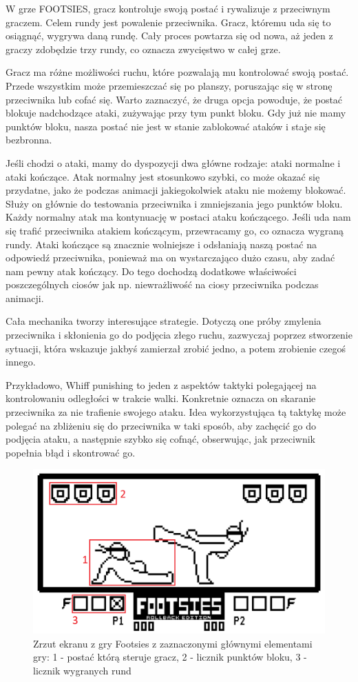 W grze FOOTSIES, gracz kontroluje swoją postać i rywalizuje z przeciwnym graczem. Celem rundy jest powalenie przeciwnika. Gracz, któremu uda się to osiągnąć, wygrywa daną rundę. Cały proces powtarza się od nowa, aż jeden z graczy zdobędzie trzy rundy, co oznacza zwycięstwo w całej grze.

Gracz ma różne możliwości ruchu, które pozwalają mu kontrolować swoją postać. Przede wszystkim może przemieszczać się po planszy, poruszając się w stronę przeciwnika lub cofać się. Warto zaznaczyć, że druga opcja powoduje, że postać blokuje nadchodzące ataki, zużywając przy tym punkt bloku. Gdy już nie mamy punktów bloku, nasza postać nie jest w stanie zablokować ataków i staje się bezbronna.

Jeśli chodzi o ataki, mamy do dyspozycji dwa główne rodzaje: ataki normalne i ataki kończące. Atak normalny jest stosunkowo szybki, co może okazać się przydatne, jako że podczas animacji jakiegokolwiek ataku nie możemy blokować. Służy on głównie do testowania przeciwnika i zmniejszania jego punktów bloku. Każdy normalny atak ma kontynuację w postaci ataku kończącego. Jeśli uda nam się trafić przeciwnika atakiem kończącym, przewracamy go, co oznacza wygraną rundy. Ataki kończące są znacznie wolniejsze i odsłaniają naszą postać na odpowiedź przeciwnika, ponieważ ma on wystarczająco dużo czasu, aby zadać nam pewny atak kończący. Do tego dochodzą dodatkowe właściwości poszczególnych ciosów jak np. niewrażliwość na ciosy przeciwnika podczas animacji.

Cała mechanika tworzy interesujące strategie. Dotyczą one próby zmylenia przeciwnika i skłonienia go do podjęcia złego ruchu, zazwyczaj poprzez stworzenie sytuacji, która wskazuje jakbyś zamierzał zrobić jedno, a potem zrobienie czegoś innego.

Przykładowo, Whiff punishing to jeden z aspektów taktyki polegającej na kontrolowaniu odległości w trakcie walki. Konkretnie oznacza on skaranie przeciwnika za nie trafienie swojego ataku. Idea wykorzystująca tą taktykę może polegać na zbliżeniu się do przeciwnika w taki sposób, aby zachęcić go do podjęcia ataku, a następnie szybko się cofnąć, obserwując, jak przeciwnik popełnia błąd i skontrować go.


\begin{figure}
	\centering
		\includegraphics[width=0.7\linewidth]{rys01/footsies}
	\caption{Zrzut ekranu z gry Footsies z zaznaczonymi głównymi elementami gry: 1 - postać którą steruje gracz, 2 - licznik punktów bloku, 3 - licznik wygranych rund}
	\label{fig:footsies}
\end{figure}



